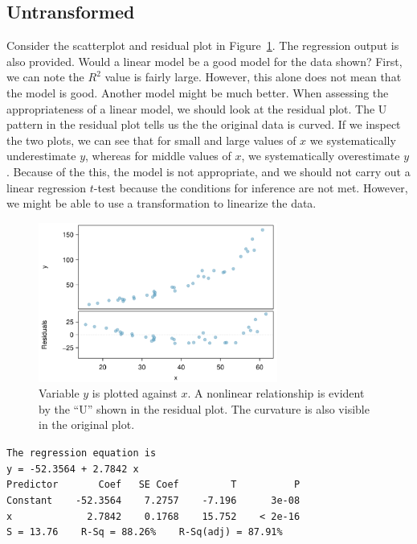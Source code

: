 \subsection{Untransformed}

\begin{example}{Consider the scatterplot and residual plot in Figure~\ref{NeedsTransform-PreTransform}. The regression output is also provided.  Would a linear model be a good model for the data shown?}
First, we can note the $R^2$ value is fairly large.  However, this alone does not mean that the model is good.  Another model might be much better.  When assessing the appropriateness of a linear model, we should look at the residual plot.  The U pattern in the residual plot tells us the the original data is curved. If we inspect the two plots, we can see that for small and large values of $x$ we systematically underestimate $y$, whereas for middle values of $x$, we systematically overestimate $y$.  Because of the this, the model is not appropriate, and we should not carry out a linear regression $t$-test because the conditions for inference are not met.  However, we might be able to use a transformation to linearize the data.
\end{example}

\begin{figure}
   \centering
   \includegraphics[width=0.7\textwidth]{ch_regr_simple_linear/figures/NeedsTransform/NeedsTransform-PreTransform}
   \caption{Variable $y$ is plotted against $x$. A nonlinear relationship is evident by the ``U'' shown in the residual plot. The curvature is also visible in the original plot.}
   \label{NeedsTransform-PreTransform}
\end{figure}

\begin{tipBox}{\texttt{The regression equation is} \\

\texttt{y = -52.3564 + 2.7842 x} \\

\texttt{Predictor \ \ \ \ \ \ Coef \ \ SE Coef \ \ \ \ \ \ \ \ T \ \ \ \ \ \ \ \ \ P} \\
\texttt{Constant \ \ \ -52.3564 \ \ \ 7.2757 \ \ \ -7.196 \ \ \ \ \ 3e-08} \\
\texttt{x \ \ \ \ \ \ \ \ \ \ \ \ 2.7842 \ \ \ 0.1768 \ \ \ 15.752 \ \ \ < 2e-16} \\

\texttt{S = 13.76\ \ \ \ R-Sq = 88.26\% \ \ \ R-Sq(adj) = 87.91\%}}
\end{tipBox}


